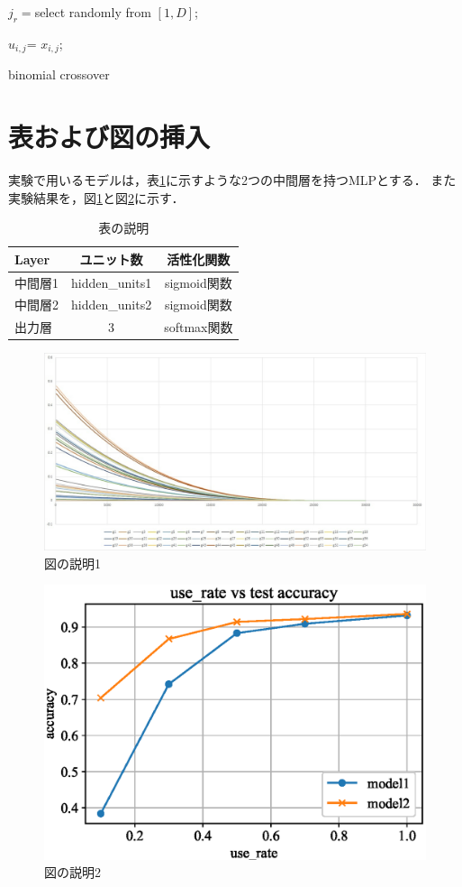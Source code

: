 \documentclass[onecolumn,10pt]{jarticle}
\begin{document}
\begin{algorithm}[htbp]
\DontPrintSemicolon
  
 $j_r=$select randomly from $[1,D]$;
 
   {
  
    {
    $u_{i,j}$=  $x_{i,j}$;
    }
   }

\caption{binomial crossover}         
\label{bin}   
\end{algorithm}




\section{表および図の挿入}
実験で用いるモデルは，表\ref{tbl:MLP}に示すような2つの中間層を持つMLPとする．
また実験結果を，図\ref{fig:graph1}と図\ref{fig:graph2}に示す．

\begin{table}[htbp]
\begin{center}
\caption{表の説明}
\label{tbl:MLP}
\begin{tabular}{|l|c|c|}
\hline
Layer     & ユニット数 & 活性化関数  \\ \hline
中間層1 & hidden\_units1   & sigmoid関数   \\ \hline
中間層2 & hidden\_units2   & sigmoid関数      \\ \hline
出力層 & 3    & softmax関数        \\ \hline
\end{tabular}
\end{center}
\end{table}


\begin{figure}[htbp]
  \centering
  \includegraphics[width=.5\linewidth]{fig/test.eps}
  \caption{図の説明1}
  \label{fig:graph1}
\end{figure}

\begin{figure}[htbp]
  \centering
  \includegraphics[width=.5\linewidth]{fig/graph2.eps}
  \caption{図の説明2}
\label{fig:graph2}
\end{figure}







\end{document}
